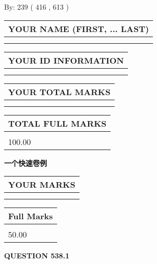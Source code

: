 \documentclass{ctexart}
\begin{document}
   
\hspace{1.0in} By: 
 239 ( 416 ,  613 )
   
   
   
   
\newpage 
\setcounter{page}{ 
   538001 } 
   
   
   
   
\noindent\begin{tabular}{|l|}
\hline
YOUR NAME (FIRST, ... LAST)  \\
\hline
 \\ 
 \\ 
\hline
\end{tabular}
\hspace{0.05in} \begin{tabular}{|l|}
\hline
 YOUR   ID   INFORMATION  \\
\hline
 \\ 
 \\ 
\hline
\end{tabular}
   
   
\vspace{0.2in}\noindent\begin{tabular}{|l|}
\hline
YOUR TOTAL MARKS  \\
\hline
 \\ 
 \\ 
\hline
\end{tabular}
\hspace{0.05in} \begin{tabular}{|l|}
\hline
TOTAL FULL MARKS  \\
\hline
 \\ 
100.00 \\
\hline
\end{tabular}
   
   
 \vspace{0.2in}
{\LARGE {\textbf{ 一个快速卷例}}}
   
   
  
\vspace{0.2in}
  
\noindent\begin{tabular}{|l|}
\hline
 YOUR MARKS  \\
\hline
 \\ 
 \\ 
\hline
\end{tabular}
\hspace{0.05in} \begin{tabular}{|l|}
\hline
 Full Marks  \\
\hline
 \\ 
50.00 \\
\hline
\end{tabular}
{\textbf{\Large{QUESTION
538.1 
}}}
  
\end{document}
